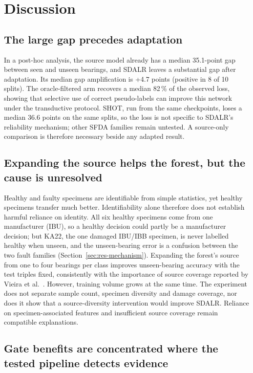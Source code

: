 \section{Discussion}
\label{sec:discussion}
\subsection{The large gap precedes adaptation}

In a post-hoc analysis, the source model already has a median 35.1-point gap between seen and unseen bearings, and SDALR leaves a substantial gap after adaptation. Its median gap amplification is +4.7 points (positive in 8 of 10 splits). The oracle-filtered arm recovers a median 82\,\% of the observed loss, showing that selective use of correct pseudo-labels can improve this network under the transductive protocol. SHOT, run from the same checkpoints, loses a median 36.6 points on the same splits, so the loss is not specific to SDALR's reliability mechanism; other SFDA families remain untested. A source-only comparison is therefore necessary beside any adapted result.

\subsection{Expanding the source helps the forest, but the cause is unresolved}

Healthy and faulty specimens are identifiable from simple statistics, yet healthy specimens transfer much better. Identifiability alone therefore does not establish harmful reliance on identity. All six healthy specimens come from one manufacturer (IBU), so a healthy decision could partly be a manufacturer decision; but KA22, the one damaged IBU/IBB specimen, is never labelled healthy when unseen, and the unseen-bearing error is a confusion between the two fault families (Section~\ref{sec:res-mechanism}). Expanding the forest's source from one to four bearings per class improves unseen-bearing accuracy with the test triples fixed, consistently with the importance of source coverage reported by Vieira et al.\ \cite{vieira2026}. However, training volume grows at the same time. The experiment does not separate sample count, specimen diversity and damage coverage, nor does it show that a source-diversity intervention would improve SDALR. Reliance on specimen-associated features and insufficient source coverage remain compatible explanations.

\subsection{Gate benefits are concentrated where the tested pipeline detects evidence}

